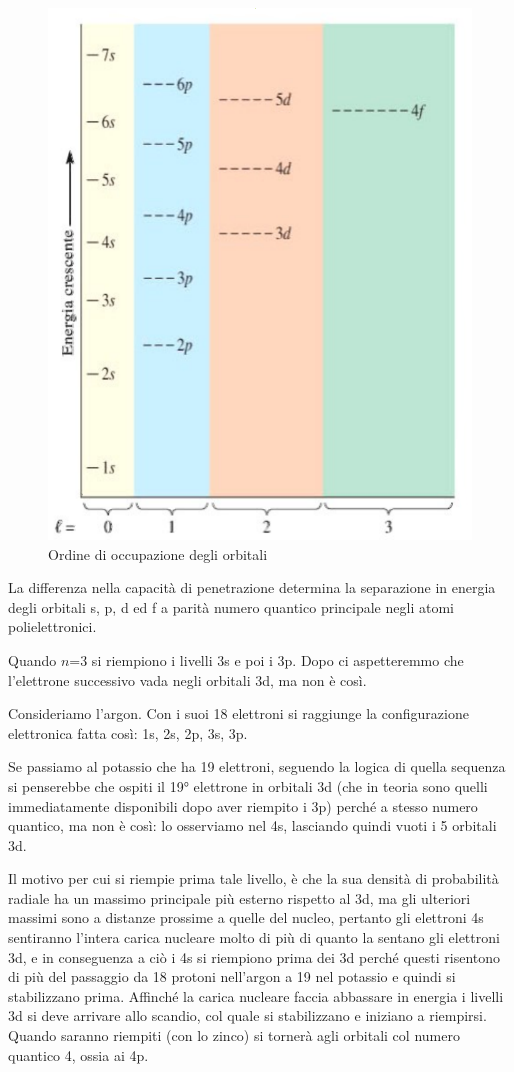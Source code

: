 \begin{figure}[htp]
  \centering
  \includegraphics[width=12cm]{immagini/livelli orbitali.png}
  \caption{Ordine di occupazione degli orbitali}
\end{figure}
La differenza nella capacità di penetrazione determina la separazione in energia degli orbitali s, p, d ed f a parità numero quantico principale negli atomi polielettronici.

Quando $n$=3 si riempiono i livelli 3s e poi i 3p. Dopo ci aspetteremmo che l'elettrone successivo vada negli orbitali 3d, ma non è così.

Consideriamo l'argon. Con i suoi 18 elettroni si raggiunge la configurazione elettronica fatta così: 1s, 2s, 2p, 3s, 3p.

Se passiamo al potassio che ha 19 elettroni, seguendo la logica di quella sequenza si penserebbe che ospiti il 19° elettrone in orbitali 3d (che in teoria sono quelli immediatamente disponibili dopo aver riempito i 3p) perché a stesso numero quantico, ma non è così: lo osserviamo nel 4s, lasciando quindi vuoti i 5 orbitali 3d.

Il motivo per cui si riempie prima tale livello, è che la sua densità di probabilità radiale ha un massimo principale più esterno rispetto al 3d, ma gli ulteriori massimi sono a distanze prossime a quelle del nucleo, pertanto gli elettroni 4s sentiranno l'intera carica nucleare molto di più di quanto la sentano gli elettroni 3d, e in conseguenza a ciò i 4s si riempiono prima dei 3d perché questi risentono di più del passaggio da 18 protoni nell'argon a 19 nel potassio e quindi si stabilizzano prima. Affinché la carica nucleare faccia abbassare in energia i livelli 3d si deve arrivare allo scandio, col quale si stabilizzano e iniziano a riempirsi. Quando saranno riempiti (con lo zinco) si tornerà agli orbitali col numero quantico 4, ossia ai 4p.

